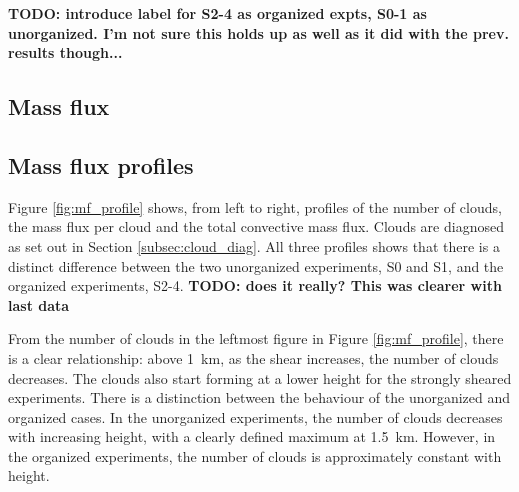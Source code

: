 \documentclass[11pt,a4paper]{article}
\newcommand\todo[1]{\textbf{TODO: #1}}
\begin{document}
\todo{introduce label for S2-4 as organized expts, S0-1 as unorganized. I'm not sure this holds up as well as it did with the prev. results though...}


\subsection{Mass flux}

\subsection{Mass flux profiles}

Figure \ref{fig:mf_profile} shows, from left to right, profiles of the number of clouds, the mass flux per cloud and the total convective mass flux. Clouds are diagnosed as set out in Section \ref{subsec:cloud_diag}. All three profiles shows that there is a distinct difference between the two unorganized experiments, S0 and S1, and the organized experiments, S2-4. \todo{does it really? This was clearer with last data}

From the number of clouds in the leftmost figure in Figure \ref{fig:mf_profile}, there is a clear relationship: above \SI{1}{km}, as the shear increases, the number of clouds decreases. The clouds also start forming at a lower height for the strongly sheared experiments. There is a distinction between the behaviour of the unorganized and organized cases. In the unorganized experiments, the number of clouds decreases with increasing height, with a clearly defined maximum at \SI{1.5}{km}. However, in the organized experiments, the number of clouds is approximately constant with height.
\end{document}
